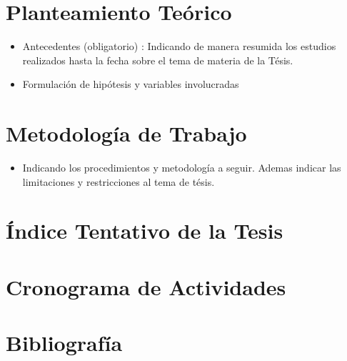 \documentclass[a4paper,11pt]{article}
\begin{document}
  
 \section{Planteamiento Teórico}
\begin{itemize}
	\item Antecedentes (obligatorio) : Indicando de manera resumida los estudios realizados hasta la fecha sobre el tema de materia de la Tésis.
	\item Formulación de hipótesis y variables involucradas
\end{itemize}
  
 \section{Metodología de Trabajo}
\begin{itemize}
	\item Indicando los procedimientos y metodología a seguir. Ademas indicar las limitaciones y restricciones al tema de tésis.

\end{itemize}
  
 \section{Índice Tentativo de la Tesis}
  \lipsum[1]
  
 \section{Cronograma de Actividades}
  \lipsum[1]
  
 \section{Bibliografía}
 
 
\end{document}
